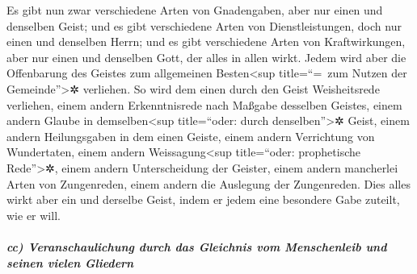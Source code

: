  Es gibt nun zwar verschiedene Arten von Gnadengaben, aber
nur einen und denselben Geist;  und es gibt verschiedene
Arten von Dienstleistungen, doch nur einen und denselben Herrn;
 und es gibt verschiedene Arten von Kraftwirkungen, aber
nur einen und denselben Gott, der alles in allen wirkt. 
Jedem wird aber die Offenbarung des Geistes zum allgemeinen
Besten\textless sup title=``=~zum Nutzen der Gemeinde''\textgreater✲
verliehen.  So wird dem einen durch den Geist
Weisheitsrede verliehen, einem andern Erkenntnisrede nach Maßgabe
desselben Geistes,  einem andern Glaube in
demselben\textless sup title=``oder: durch denselben''\textgreater✲
Geist, einem andern Heilungsgaben in dem einen Geiste, 
einem andern Verrichtung von Wundertaten, einem andern
Weissagung\textless sup title=``oder: prophetische Rede''\textgreater✲,
einem andern Unterscheidung der Geister, einem andern mancherlei Arten
von Zungenreden, einem andern die Auslegung der Zungenreden.
 Dies alles wirkt aber ein und derselbe Geist, indem er
jedem eine besondere Gabe zuteilt, wie er will.

\hypertarget{cc-veranschaulichung-durch-das-gleichnis-vom-menschenleib-und-seinen-vielen-gliedern}{%
\subparagraph{cc) Veranschaulichung durch das Gleichnis vom Menschenleib
und seinen vielen
Gliedern}\label{cc-veranschaulichung-durch-das-gleichnis-vom-menschenleib-und-seinen-vielen-gliedern}}


